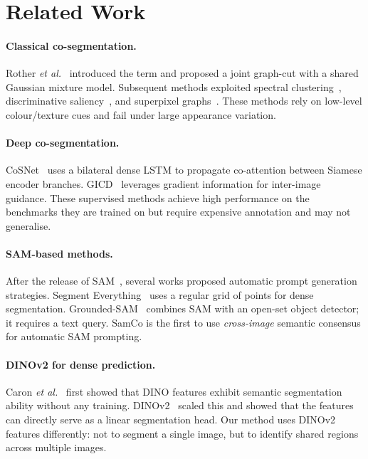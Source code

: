 \documentclass[10pt,twocolumn,letterpaper]{article}
\begin{document}
\section{Related Work}
\label{sec:related}

\paragraph{Classical co-segmentation.}
Rother \emph{et al.}~\cite{rother2006cosegmentation} introduced the term and
proposed a joint graph-cut with a shared Gaussian mixture model.
Subsequent methods exploited spectral clustering~\cite{kim2011co},
discriminative saliency~\cite{chen2010preattentive}, and superpixel
graphs~\cite{vicente2011object}.
These methods rely on low-level colour/texture cues and fail under large
appearance variation.

\paragraph{Deep co-segmentation.}
CoSNet~\cite{li2019cosegnet} uses a bilateral dense LSTM to propagate
co-attention between Siamese encoder branches.
GICD~\cite{zhang2020gradient} leverages gradient information for
inter-image guidance.
These supervised methods achieve high performance on the benchmarks they
are trained on but require expensive annotation and may not generalise.

\paragraph{SAM-based methods.}
After the release of SAM~\cite{kirillov2023sam}, several works proposed
automatic prompt generation strategies.
Segment Everything~\cite{kirillov2023sam} uses a regular grid of points for
dense segmentation.
Grounded-SAM~\cite{ren2024grounded} combines SAM with an open-set object
detector; it requires a text query.
SamCo is the first to use \emph{cross-image} semantic consensus for automatic
SAM prompting.

\paragraph{DINOv2 for dense prediction.}
Caron \emph{et al.}~\cite{caron2021emerging} first showed that DINO features
exhibit semantic segmentation ability without any training.
DINOv2~\cite{oquab2023dinov2} scaled this and showed that the features can
directly serve as a linear segmentation head.
Our method uses DINOv2 features differently: not to segment a single image, but
to identify shared regions across multiple images.
\end{document}
